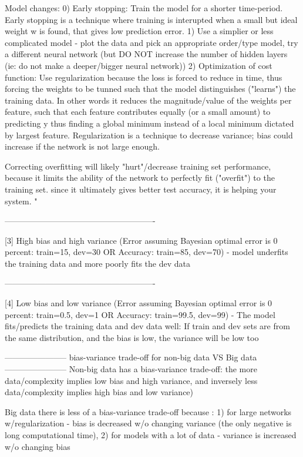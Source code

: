 \documentclass[11pt, onecolumn]{article}
\begin{document}
Model changes:
0) Early stopping: Train the model for a shorter time-period. Early stopping is a technique where training is interupted when a small but ideal weight w is found, that gives low prediction error.
1) Use a simplier or less complicated model - plot the data and pick an appropriate order/type model, try a different neural network (but DO NOT increase the number of hidden layers (ie: do not make a deeper/bigger neural network))
2) Optimization of cost function: Use regularization because the loss is forced to reduce in time, thus forcing the weights to be tunned such that the model distinguishes ("learns") the training data. In other words it reduces the magnitude/value of the weights per feature, such that each feature contributes equally (or a small amount) to predicting y thus finding a global minimum instead of a local minimum dictated by largest feature. Regularization is a technique to decrease variance; bias could increase if the network is not large enough.

Correcting overfitting will likely "hurt"/decrease training set performance, because it limits the ability of the network to perfectly fit ("overfit") to the training set.  since it ultimately gives better test accuracy, it is helping your system. "

-------------------------------------------------------

[3]  High bias and high variance (Error assuming Bayesian optimal error is 0 percent: train=15, dev=30 OR Accuracy: train=85, dev=70)
	- model underfits the training data and more poorly fits the dev data 

-------------------------------------------------------

[4] Low bias and low variance (Error assuming Bayesian optimal error is 0 percent: train=0.5, dev=1 OR Accuracy: train=99.5, dev=99)
	- The model fits/predicts the training data and dev data well: If train and dev sets are from the same distribution, and the bias is low, the variance will be low too


-----------------------
bias-variance trade-off for non-big data VS Big data
-----------------------
Non-big data has a bias-variance trade-off: the more data/complexity implies low bias and high variance, and inversely less data/complexity implies high bias and low variance)

Big data there is less of a bias-variance trade-off because : 1) for large networks w/regularization - bias is decreased w/o changing variance (the only negative is long computational time), 2) for models with a lot of data - variance is increased w/o changing bias
\end{document}
